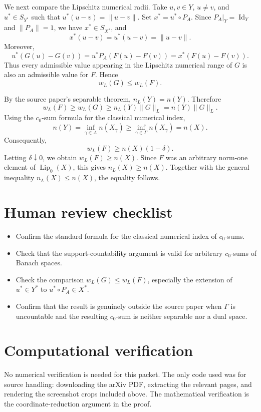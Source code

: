 \documentclass[11pt]{article}
\DeclareMathOperator{\Lip}{Lip}
\begin{document}
We next compare the Lipschitz numerical radii. Take \(u,v\in Y\), \(u\neq v\), and \(u^*\in S_{Y^*}\) such that \(u^*(u-v)=\|u-v\|\). Set \(x^*=u^*\circ P_A\). Since \(P_A|_Y=\operatorname{Id}_Y\) and \(\|P_A\|=1\), we have \(x^*\in S_{X^*}\), and
\[
    x^*(u-v)=u^*(u-v)=\|u-v\|.
\]
Moreover,
\[
    u^*(G(u)-G(v))
    =
    u^*P_A(F(u)-F(v))
    =
    x^*(F(u)-F(v)).
\]
Thus every admissible value appearing in the Lipschitz numerical range of \(G\) is also an admissible value for \(F\). Hence
\[
    w_L(G)\leq w_L(F).
\]

By the source paper's separable theorem, \(n_L(Y)=n(Y)\). Therefore
\[
    w_L(F)\geq w_L(G)\geq n_L(Y)\|G\|_L=n(Y)\|G\|_L.
\]
Using the \(c_0\)-sum formula for the classical numerical index,
\[
    n(Y)=\inf_{\gamma\in A} n(X_\gamma)
    \geq
    \inf_{\gamma\in\Gamma} n(X_\gamma)
    =
    n(X).
\]
Consequently,
\[
    w_L(F)\geq n(X)(1-\delta).
\]
Letting \(\delta\downarrow0\), we obtain \(w_L(F)\geq n(X)\). Since \(F\) was an arbitrary norm-one element of \(\Lip_0(X)\), this gives \(n_L(X)\geq n(X)\). Together with the general inequality \(n_L(X)\leq n(X)\), the equality follows.

\section*{Human review checklist}

\begin{itemize}
\item Confirm the standard formula for the classical numerical index of \(c_0\)-sums.
\item Check that the support-countability argument is valid for arbitrary \(c_0\)-sums of Banach spaces.
\item Check the comparison \(w_L(G)\leq w_L(F)\), especially the extension of \(u^*\in Y^*\) to \(u^*\circ P_A\in X^*\).
\item Confirm that the result is genuinely outside the source paper when \(\Gamma\) is uncountable and the resulting \(c_0\)-sum is neither separable nor a dual space.
\end{itemize}

\section*{Computational verification}

No numerical verification is needed for this packet. The only code used was for source handling: downloading the arXiv PDF, extracting the relevant pages, and rendering the screenshot crops included above. The mathematical verification is the coordinate-reduction argument in the proof.
\end{document}
